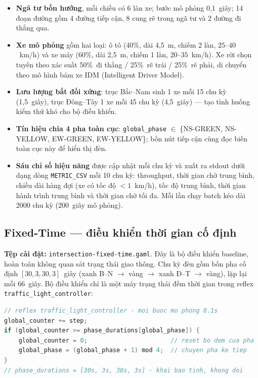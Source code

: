 \documentclass[11pt,a4paper]{article}
\begin{document}
\begin{itemize}[leftmargin=*]
    \item \textbf{Ngã tư bốn hướng}, mỗi chiều có 6 làn xe; bước mô phỏng 0,1~giây;
    14 đoạn đường gồm 4 đường tiếp cận, 8 cung rẽ trong ngã tư và 2 đường đi thẳng qua.
    \item \textbf{Xe mô phỏng} gồm hai loại: ô tô (40\%, dài 4,5~m, chiếm 2 làn,
    $25$--$40$~km/h) và xe máy (60\%, dài 2,5~m, chiếm 1 làn, $20$--$35$~km/h).
    Xe rời chọn tuyến theo xác suất 50\%~đi thẳng / 25\%~rẽ trái / 25\%~rẽ phải,
    di chuyển theo mô hình bám xe IDM (Intelligent Driver Model).
    \item \textbf{Lưu lượng bất đối xứng}: trục Bắc--Nam sinh 1 xe mỗi 15 chu kỳ
    (1,5~giây), trục Đông--Tây 1 xe mỗi 45 chu kỳ (4,5~giây) --- tạo tình huống
    kiểm thử khó cho bộ điều khiển.
    \item \textbf{Tín hiệu chia 4 pha toàn cục}: \texttt{global\_phase} $\in$
    \{NS-GREEN, NS-YELLOW, EW-GREEN, EW-YELLOW\}; bốn nút tiếp cận cùng đọc biến
    toàn cục này để hiển thị đèn.
    \item \textbf{Sáu chỉ số hiệu năng} được cập nhật mỗi chu kỳ và xuất ra stdout
    dưới dạng dòng \texttt{METRIC\_CSV} mỗi 10 chu kỳ: throughput, thời gian chờ
    trung bình, chiều dài hàng đợi (xe có tốc độ $<1$~km/h), tốc độ trung bình,
    thời gian hành trình trung bình và thời gian chờ tối đa. Mỗi lần chạy batch
    kéo dài 2000 chu kỳ (200~giây mô phỏng).
\end{itemize}

\subsection{Fixed-Time --- điều khiển thời gian cố định}

\textbf{Tệp cài đặt:} \texttt{intersection-fixed-time.gaml}. Đây là bộ điều khiển
baseline, hoàn toàn không quan sát trạng thái giao thông. Chu kỳ đèn gồm bốn pha
cố định $\left[30, 3, 30, 3\right]$~giây (xanh B--N $\rightarrow$ vàng $\rightarrow$
xanh Đ--T $\rightarrow$ vàng), lặp lại mỗi 66~giây. Bộ điều khiển chỉ là một
máy trạng thái đếm thời gian trong reflex \texttt{traffic\_light\_controller}:

\begin{lstlisting}[language=Java]
// reflex traffic_light_controller - moi buoc mo phong 0.1s
global_counter += step;
if (global_counter >= phase_durations[global_phase]) {
    global_counter = 0;                       // reset bo dem cua pha
    global_phase = (global_phase + 1) mod 4;  // chuyen pha ke tiep
}
// phase_durations = [30s, 3s, 30s, 3s] - khai bao tinh, khong doi
\end{lstlisting}
\end{document}
